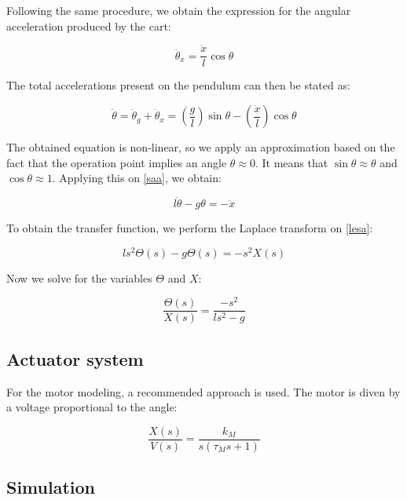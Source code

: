 Following the same procedure, we obtain the expression for the angular acceleration produced by the cart:

\begin{equation} \label{aac}
	\ddot{\theta}_x=\frac{\ddot{x}}{l}\cos{\theta}
\end{equation}

The total accelerations present on the pendulum can then be stated as:

\begin{equation} \label{saa}
	\ddot{\theta}=\ddot{\theta}_g+\ddot{\theta}_x=\left(\frac{g}{l}\right)\sin{\theta}-\left(\frac{\ddot{x}}{l}\right)\cos{\theta}
\end{equation}

The obtained equation is non-linear, so we apply an approximation based on the fact that the operation point implies an angle $\theta\approx0$. It means that $\sin{\theta}\approx\theta$ and $\cos{\theta}\approx1$. Applying this on \ref{saa}, we obtain:

\begin{equation} \label{lesa}
	l\ddot{\theta}-g\theta=-\ddot{x}
\end{equation}

To obtain the transfer function, we perform the Laplace transform on \ref{lesa}:

\begin{equation} \label{ltsa}
	ls^2\Theta(s)-g\Theta(s)=-s^2X(s)
\end{equation}

Now we solve for the variables $\Theta$ and $X$:

\begin{equation} \label{tfsa}
	\frac{\Theta(s)}{X(s)}=\frac{-s^2}{ls^2-g}
\end{equation}

\subsection{Actuator system}

For the motor modeling, a recommended approach \cite{LUN02} is used. The motor is diven by a voltage proportional to the angle:

\begin{equation} \label{mtf2}
	\frac{X(s)}{V(s)}=\frac{k_M}{s(\tau_M s+1)}
\end{equation}

\subsection{Simulation}

